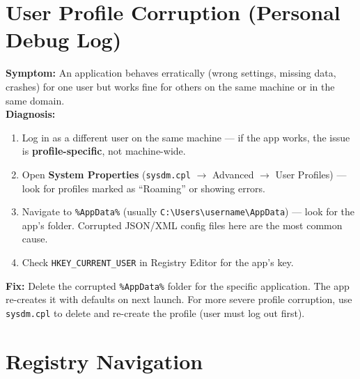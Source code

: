 \documentclass[11pt, letterpaper]{article}
\begin{document}
\section*{User Profile Corruption (Personal Debug Log)}

\begin{tcolorbox}[colback=logbg, colframe=logborder,
  title={\bfseries Debug Log \#002 --- Erratic App Behavior for Specific Users}, arc=3pt, boxrule=1pt]
\textbf{Symptom:} An application behaves erratically (wrong settings, missing data, crashes) for one user but works fine for others on the same machine or in the same domain.\\[4pt]
\textbf{Diagnosis:}
\begin{enumerate}[noitemsep, leftmargin=*]
  \item Log in as a different user on the same machine --- if the app works, the issue is \textbf{profile-specific}, not machine-wide.
  \item Open \textbf{System Properties} (\texttt{sysdm.cpl} $\to$ Advanced $\to$ User Profiles) --- look for profiles marked as ``Roaming'' or showing errors.
  \item Navigate to \texttt{\%AppData\%} (usually \texttt{C:\textbackslash Users\textbackslash username\textbackslash AppData}) --- look for the app's folder. Corrupted JSON/XML config files here are the most common cause.
  \item Check \texttt{HKEY\_CURRENT\_USER} in Registry Editor for the app's key.
\end{enumerate}
\textbf{Fix:} Delete the corrupted \texttt{\%AppData\%} folder for the specific application. The app re-creates it with defaults on next launch. For more severe profile corruption, use \texttt{sysdm.cpl} to delete and re-create the profile (user must log out first).
\end{tcolorbox}

\section*{Registry Navigation}
\end{document}
